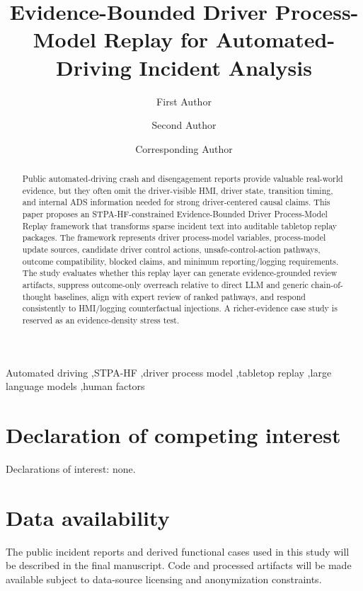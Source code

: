 \documentclass[preprint,12pt,authoryear]{elsarticle}
\begin{document}
\begin{frontmatter}

\title{Evidence-Bounded Driver Process-Model Replay for Automated-Driving Incident Analysis}

\author[aff1]{First Author}
\author[aff1]{Second Author}
\author[aff1]{Corresponding Author}

\begin{abstract}
Public automated-driving crash and disengagement reports provide valuable real-world evidence, but they often omit the driver-visible HMI, driver state, transition timing, and internal ADS information needed for strong driver-centered causal claims. This paper proposes an STPA-HF-constrained Evidence-Bounded Driver Process-Model Replay framework that transforms sparse incident text into auditable tabletop replay packages. The framework represents driver process-model variables, process-model update sources, candidate driver control actions, unsafe-control-action pathways, outcome compatibility, blocked claims, and minimum reporting/logging requirements. The study evaluates whether this replay layer can generate evidence-grounded review artifacts, suppress outcome-only overreach relative to direct LLM and generic chain-of-thought baselines, align with expert review of ranked pathways, and respond consistently to HMI/logging counterfactual injections. A richer-evidence case study is reserved as an evidence-density stress test.
\end{abstract}

\begin{keyword}
Automated driving \sep STPA-HF \sep driver process model \sep tabletop replay \sep large language models \sep human factors
\end{keyword}

\end{frontmatter}






\section*{Declaration of competing interest}
Declarations of interest: none.

\section*{Data availability}
The public incident reports and derived functional cases used in this study will be described in the final manuscript. Code and processed artifacts will be made available subject to data-source licensing and anonymization constraints.



\end{document}
